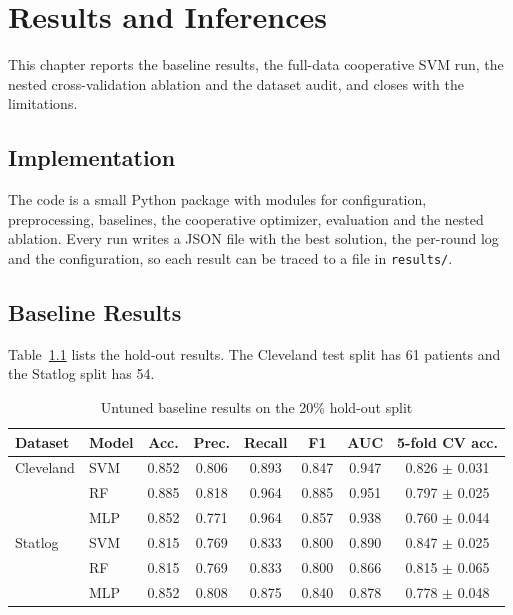 \documentclass[MTech]{ugthesis}
\begin{document}
\chapter{Results and Inferences}
\label{chap:results}

This chapter reports the baseline results, the full-data cooperative SVM run, the nested cross-validation ablation and the dataset audit, and closes with the limitations.

\section{Implementation}
The code is a small Python package with modules for configuration, preprocessing, baselines, the cooperative optimizer, evaluation and the nested ablation. Every run writes a JSON file with the best solution, the per-round log and the configuration, so each result can be traced to a file in \texttt{results/}.

\section{Baseline Results}
Table~\ref{tab:baseline} lists the hold-out results. The Cleveland test split has 61 patients and the Statlog split has 54.

\begin{table}[htpb]
\small
\renewcommand{\arraystretch}{1.25}
\caption{Untuned baseline results on the 20\% hold-out split}
\label{tab:baseline}
\begin{tabular}{|p{1.9cm}|p{1.6cm}|c|c|c|c|c|c|}
\hline
\textbf{Dataset} & \textbf{Model} & \textbf{Acc.} & \textbf{Prec.} & \textbf{Recall} & \textbf{F1} & \textbf{AUC} & \textbf{5-fold CV acc.} \\ \hline
Cleveland & SVM & 0.852 & 0.806 & 0.893 & 0.847 & 0.947 & 0.826 $\pm$ 0.031 \\
          & RF  & 0.885 & 0.818 & 0.964 & 0.885 & 0.951 & 0.797 $\pm$ 0.025 \\
          & MLP & 0.852 & 0.771 & 0.964 & 0.857 & 0.938 & 0.760 $\pm$ 0.044 \\ \hline
Statlog   & SVM & 0.815 & 0.769 & 0.833 & 0.800 & 0.890 & 0.847 $\pm$ 0.025 \\
          & RF  & 0.815 & 0.769 & 0.833 & 0.800 & 0.866 & 0.815 $\pm$ 0.065 \\
          & MLP & 0.852 & 0.808 & 0.875 & 0.840 & 0.878 & 0.778 $\pm$ 0.048 \\ \hline
\end{tabular}
\end{table}
\end{document}
